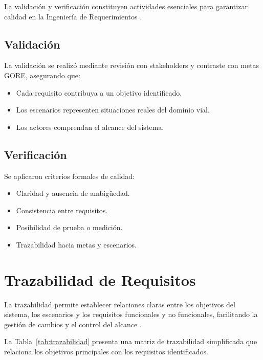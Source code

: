 \documentclass[12pt]{article}
\begin{document}
	La validación y verificación constituyen actividades esenciales para garantizar calidad en la Ingeniería de Requerimientos \cite{ISO29148,Khalid2025}.
	
	\subsection{Validación}
	
	La validación se realizó mediante revisión con stakeholders y contraste con metas GORE, asegurando que:
	
	\begin{itemize}
		\item Cada requisito contribuya a un objetivo identificado.
		\item Los escenarios representen situaciones reales del dominio vial.
		\item Los actores comprendan el alcance del sistema.
	\end{itemize}
	
	\subsection{Verificación}
	
	Se aplicaron criterios formales de calidad:
	
	\begin{itemize}
		\item Claridad y ausencia de ambigüedad.
		\item Consistencia entre requisitos.
		\item Posibilidad de prueba o medición.
		\item Trazabilidad hacia metas y escenarios.
	\end{itemize}
	
	
	\section{Trazabilidad de Requisitos}
	
	La trazabilidad permite establecer relaciones claras entre los objetivos del sistema, los escenarios y los requisitos funcionales y no funcionales, facilitando la gestión de cambios y el control del alcance \cite{Gotel1994}.
	
	La Tabla~\ref{tab:trazabilidad} presenta una matriz de trazabilidad simplificada que relaciona los objetivos principales con los requisitos identificados.
	
\end{document}
